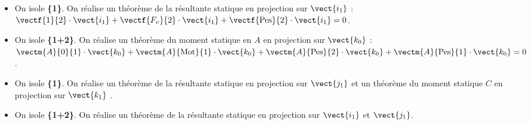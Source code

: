 \else
\fi

\ifprof

\begin{itemize}
\item On isole \textbf{\{1\}}. On réalise un théorème de la résultante statique en projection sur $\vect{i_1}$ :
$ \vectf{1}{2}\cdot \vect{i_1} + \vectf{F_v}{2}\cdot \vect{i_1} + \vectf{\text{Pes}}{2}\cdot \vect{i_1} = 0$.
\item On isole \textbf{\{1+2\}}. On réalise un théorème du moment statique en $A$ en projection sur $\vect{k_0}$ :
$ \vectm{A}{0}{1}\cdot \vect{k_0} 
+ \vectm{A}{\text{Mot}}{1}\cdot \vect{k_0} 
+ \vectm{A}{\text{Pes}}{2}\cdot \vect{k_0}
+ \vectm{A}{\text{Pes}}{1}\cdot \vect{k_0} = 0$.
\end{itemize}

\else
\fi


\ifprof

\begin{itemize}
\item On isole \textbf{\{1\}}. On réalise un théorème de la résultante statique en projection sur $\vect{j_1}$ 
et un théorème du moment statique $C$ en projection sur $\vect{k_1}$ .
\item On isole \textbf{\{1+2\}}. On réalise un théorème de la résultante statique en projection sur $\vect{i_1}$ et $\vect{j_1}$.
\end{itemize}
\else
\fi

\ifprof
\else


\fi